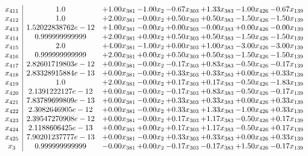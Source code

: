 \documentclass[8pt]{article}
\begin{document}
\[\begin{array}{c| c c@{\hskip 2pt} c@{\hskip 2pt} c@{\hskip 2pt} c@{\hskip 2pt} c@{\hskip 2pt} c@{\hskip 2pt} }
 x_{411}   &  1.0 & +  1.00 x_{381} & -1.00 x_{2} & -0.67 x_{303} & +  1.33 x_{383} & -1.00 x_{426} & -0.67 x_{139}\\
 x_{412}   &  1.0 & +  2.00 x_{381} & -0.00 x_{2} & +  0.50 x_{303} & +  0.50 x_{383} & -1.50 x_{426} & -1.50 x_{139}\\
 x_{413}   &  1.52022838762e-12 & +  1.00 x_{381} & -0.00 x_{2} & +  0.00 x_{303} & -0.00 x_{383} & +  0.00 x_{426} & -0.00 x_{139}\\
 x_{414}   &  0.999999999999 & +  2.00 x_{381} & +  0.00 x_{2} & +  0.50 x_{303} & +  0.50 x_{383} & -1.50 x_{426} & -1.50 x_{139}\\
 x_{415}   &  2.0 & +  4.00 x_{381} & -1.00 x_{2} & +  0.00 x_{303} & +  1.00 x_{383} & -3.00 x_{426} & -3.00 x_{139}\\
 x_{416}   &  0.999999999999 & +  2.00 x_{381} & +  0.00 x_{2} & +  0.50 x_{303} & +  0.50 x_{383} & -1.50 x_{426} & -1.50 x_{139}\\
 x_{417}   &  2.82601719803e-12 & +  0.00 x_{381} & -0.00 x_{2} & -0.17 x_{303} & +  0.83 x_{383} & -0.50 x_{426} & -0.17 x_{139}\\
 x_{418}   &  2.83328915884e-13 & +  0.00 x_{381} & -0.00 x_{2} & +  0.33 x_{303} & +  0.33 x_{383} & +  0.00 x_{426} & +  0.33 x_{139}\\
 x_{419}   &  1.0 & +  2.00 x_{381} & -0.00 x_{2} & +  0.17 x_{303} & +  0.17 x_{383} & -0.50 x_{426} & -1.83 x_{139}\\
 x_{420}   &  2.1391222127e-12 & +  0.00 x_{381} & -0.00 x_{2} & -0.17 x_{303} & +  0.83 x_{383} & -0.50 x_{426} & -0.17 x_{139}\\
 x_{421}   &  7.83789699809e-13 & +  0.00 x_{381} & -0.00 x_{2} & +  0.33 x_{303} & +  0.33 x_{383} & +  0.00 x_{426} & +  0.33 x_{139}\\
 x_{422}   &  2.3082646905e-12 & +  0.00 x_{381} & -0.00 x_{2} & +  0.33 x_{303} & +  1.33 x_{383} & -1.00 x_{426} & +  0.33 x_{139}\\
 x_{423}   &  2.39547270908e-12 & +  0.00 x_{381} & -0.00 x_{2} & +  0.17 x_{303} & +  1.17 x_{383} & -0.50 x_{426} & +  0.17 x_{139}\\
 x_{424}   &  2.1188606425e-13 & +  0.00 x_{381} & +  0.00 x_{2} & +  0.17 x_{303} & +  1.17 x_{383} & -0.50 x_{426} & +  0.17 x_{139}\\
 x_{425}   &  7.90201237777e-13 & +  0.00 x_{381} & -0.00 x_{2} & +  0.33 x_{303} & +  0.33 x_{383} & +  0.00 x_{426} & +  0.33 x_{139}\\
 x_{3}   &  0.999999999999 & -0.00 x_{381} & +  0.00 x_{2} & -0.17 x_{303} & -0.17 x_{383} & +  1.50 x_{426} & -0.17 x_{139}\\

\end{array}\]
\end{document}

